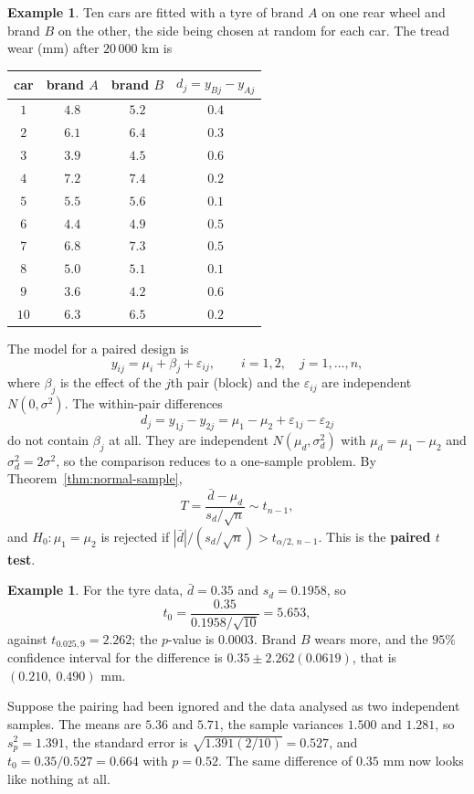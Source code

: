 \documentclass[11pt,a4paper]{article}
\numberwithin{equation}{section}
\theoremstyle{definition}
\newtheorem{exa}[thm]{Example}
\begin{document}
\begin{exa}\label{exa:tyre-pairs}
Ten cars are fitted with a tyre of brand $A$ on one rear wheel and brand $B$ on the other, the side being chosen at random for each car. The tread
wear (mm) after $20\,000$ km is
\begin{center}
\begin{tabular}{c|cc|c}
car & brand $A$ & brand $B$ & $d_j = y_{Bj} - y_{Aj}$ \\
\hline
$1$ & $4.8$ & $5.2$ & $0.4$ \\
$2$ & $6.1$ & $6.4$ & $0.3$ \\
$3$ & $3.9$ & $4.5$ & $0.6$ \\
$4$ & $7.2$ & $7.4$ & $0.2$ \\
$5$ & $5.5$ & $5.6$ & $0.1$ \\
$6$ & $4.4$ & $4.9$ & $0.5$ \\
$7$ & $6.8$ & $7.3$ & $0.5$ \\
$8$ & $5.0$ & $5.1$ & $0.1$ \\
$9$ & $3.6$ & $4.2$ & $0.6$ \\
$10$ & $6.3$ & $6.5$ & $0.2$ \\
\end{tabular}
\end{center}
\end{exa}

The model for a paired design is
\[
y_{ij} = \mu_i + \beta_j + \varepsilon_{ij} , \qquad i = 1, 2 , \quad j = 1, \dots, n ,
\]
where $\beta_j$ is the effect of the $j$th pair (block) and the $\varepsilon_{ij}$ are independent $N(0, \sigma^2)$. The within-pair differences
\[
d_j = y_{1j} - y_{2j} = \mu_1 - \mu_2 + \varepsilon_{1j} - \varepsilon_{2j}
\]
do not contain $\beta_j$ at all. They are independent $N(\mu_d, \sigma_d^2)$ with $\mu_d = \mu_1 - \mu_2$ and $\sigma_d^2 = 2\sigma^2$, so the comparison reduces to a one-sample
problem. By Theorem~\ref{thm:normal-sample},
\[
T = \frac{\bar d - \mu_d}{s_d/\sqrt n} \sim t_{n-1} ,
\]
and $H_0 : \mu_1 = \mu_2$ is rejected if $|\bar d|/(s_d/\sqrt n) > t_{\alpha/2,\,n-1}$. This is the \textbf{paired $t$ test}.

\begin{exa}
For the tyre data, $\bar d = 0.35$ and $s_d = 0.1958$, so
\[
t_0 = \frac{0.35}{0.1958/\sqrt{10}} = 5.653 ,
\]
against $t_{0.025,9} = 2.262$; the $p$-value is $0.0003$. Brand $B$ wears more, and the $95\%$ confidence interval for the difference is
$0.35 \pm 2.262(0.0619)$, that is $(0.210,\ 0.490)$ mm.

Suppose the pairing had been ignored and the data analysed as two independent samples. The means are $5.36$ and $5.71$, the sample variances
$1.500$ and $1.281$, so $s_p^2 = 1.391$, the standard error is $\sqrt{1.391(2/10)} = 0.527$, and $t_0 = 0.35/0.527 = 0.664$ with $p = 0.52$. The same difference of
$0.35$ mm now looks like nothing at all.
\end{exa}
\end{document}
